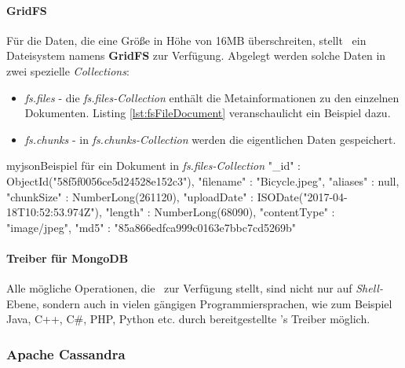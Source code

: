 \paragraph{GridFS}
Für die Daten, die eine Größe in Höhe von 16MB überschreiten, stellt \mongo\ ein Dateisystem namens \textbf{GridFS} zur Verfügung. Abgelegt werden solche Daten in zwei spezielle \textit{Collections}:

\begin{itemize}

\item \textit{fs.files} - die \textit{fs.files-Collection} enthält die Metainformationen zu den einzelnen Dokumenten. Listing \ref{lst:fsFileDocument} veranschaulicht ein Beispiel dazu.
\item \textit{fs.chunks} - in \textit{fs.chunks-Collection} werden die eigentlichen Daten gespeichert.

\end{itemize}

\begin{listingsboxJava}[label={lst:fsFileDocument}]{myjson}{Beispiel für ein Dokument in \textit{fs.files-Collection}}
{
	"_id" : ObjectId("58f5f0056ce5d24528e152c3"),
	"filename" : "Bicycle.jpeg",
	"aliases" : null,
	"chunkSize" : NumberLong(261120),
	"uploadDate" : ISODate("2017-04-18T10:52:53.974Z"),
	"length" : NumberLong(68090),
	"contentType" : "image/jpeg",
	"md5" : "85a866edfca999c0163e7bbc7cd5269b"
}
\end{listingsboxJava}

\paragraph{Treiber für MongoDB}
Alle mögliche Operationen, die \mongo\ zur Verfügung stellt, sind nicht nur auf \textit{Shell-}Ebene, sondern auch in vielen gängigen Programmiersprachen, wie zum Beispiel Java, C++, C\#, PHP, Python etc. durch bereitgestellte \mongo's Treiber \cite{mongoTreiber} möglich.

\subsubsection{Apache Cassandra}

